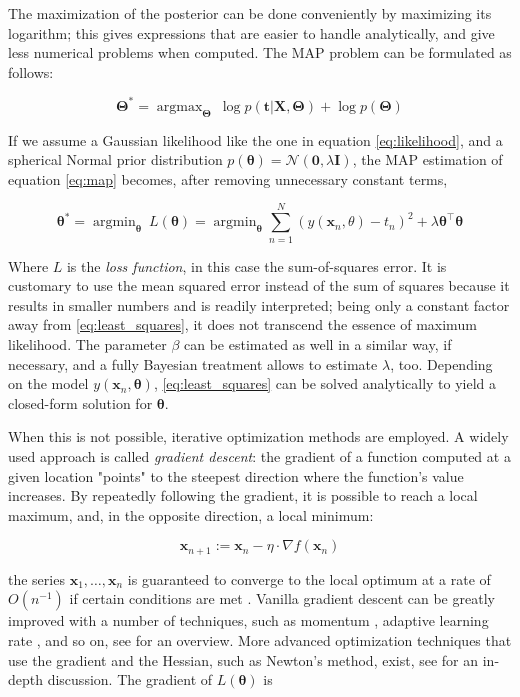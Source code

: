 \documentclass[12pt]{book}
\DeclareMathOperator*{\argmin}{argmin}
\DeclareMathOperator*{\argmax}{argmax}
\begin{document}
The maximization of the posterior can be done conveniently by maximizing its logarithm; this gives expressions that are easier to handle analytically, and give less numerical problems when computed. The MAP problem can be formulated as follows:

\begin{equation}
\bm\Theta^*=\argmax_{\bm\Theta}\ \log p(\bm t\vert\bm X,\bm\Theta)+\log p(\bm\Theta)
\end{equation}


If we assume a Gaussian likelihood like the one in equation \ref{eq:likelihood}, and a spherical Normal prior distribution $p(\bm\theta)=\mathcal{N}(\bm 0, \lambda\bm I)$, the MAP estimation of equation \ref{eq:map} becomes, after removing unnecessary constant terms,

\begin{equation}
\label{eq:least_squares}
\bm\theta^*=\argmin_{\bm\theta}\ L(\bm\theta)=\argmin_{\bm\theta}\sum_{n=1}^N\left( y(\bm x_n,\theta)-t_n\right)^2+\lambda\bm\theta^\intercal\bm\theta
\end{equation}

Where $L$ is the \emph{loss function}, in this case the sum-of-squares error. It is customary to use the mean squared error instead of the sum of squares because it results in smaller numbers and is readily interpreted; being only a constant factor away from \ref{eq:least_squares}, it does not transcend the essence of maximum likelihood. The parameter $\beta$ can be estimated as well in a similar way, if necessary, and a fully Bayesian treatment allows to estimate $\lambda$, too. Depending on the model $y(\bm x_n,\bm\theta)$, \ref{eq:least_squares} can be solved analytically to yield a closed-form solution for $\bm\theta$.
 
When this is not possible, iterative optimization methods are employed. A widely used approach is called \emph{gradient descent}: the gradient of a function computed at a given location "points" to the steepest direction where the function's value increases. By repeatedly following the gradient, it is possible to reach a local maximum, and, in the opposite direction, a local minimum:

\begin{equation}
\bm x_{n+1}:=\bm x_n-\eta\cdot\nabla f(\bm x_n)
\end{equation}

the series $\bm x_1,\ldots,\bm x_n$ is guaranteed to converge to the local optimum at a rate of $O(n^{-1})$ if certain conditions are met \cite{gd_convergence}. Vanilla gradient descent can be greatly improved with a number of techniques, such as momentum \cite{gd_momentum}, adaptive learning rate \cite{adagrad, adadelta, adam}, and so on, see \cite{gd_overview} for an overview. More advanced optimization techniques that use the gradient and the Hessian, such as Newton's method, exist, see \cite{numopt} for an in-depth discussion. The gradient of $L(\bm\theta)$ is
\end{document}
